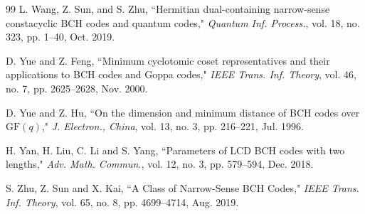 \documentclass[12pt,draftcls,journal,onecolumn]{IEEEtran}
\newcommand{\gf}{{\mathrm{GF}}}
\begin{document}
\begin{thebibliography}{99}
 L. Wang, Z. Sun, and S. Zhu, ``Hermitian dual-containing narrow-sense constacyclic BCH codes and quantum codes," {\it Quantum  Inf. Process.}, vol. 18, no. 323, pp. 1--40, Oct. 2019.



 D. Yue and Z. Feng, ``Minimum cyclotomic coset representatives
and their applications to BCH codes and Goppa codes," {\it IEEE Trans.
Inf. Theory}, vol. 46, no. 7, pp. 2625--2628, Nov. 2000.

 D. Yue and Z. Hu, ``On the dimension and minimum
distance of BCH codes over $\gf(q)$," {\it J. Electron., China}, vol. 13, no. 3, pp. 216--221, Jul. 1996.


 H. Yan, H. Liu, C. Li and S. Yang, ``Parameters of LCD BCH codes with two lengths," {\it Adv. Math. Commun.}, vol. 12, no. 3, pp. 579--594, Dec. 2018.




 S. Zhu, Z. Sun and X. Kai,
``A Class of Narrow-Sense BCH Codes," {\it IEEE Trans. Inf. Theory}, vol. 65, no. 8, pp. 4699--4714, Aug. 2019.



\end{thebibliography}
\end{document}
